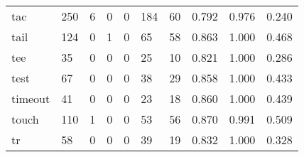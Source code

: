 \begin{longtable}{lp{1.3cm}p{1.3cm}p{1.3cm}p{1.3cm}p{1.3cm}p{1.3cm}p{1.3cm}p{1.3cm}p{1.3cm}}
tac       &                    250 &                                             6 &                                            0 &                                           0 &                                          184 &                                         60 &                                0.792 &                                  0.976 &                                0.240 \\
tail      &                    124 &                                             0 &                                            1 &                                           0 &                                           65 &                                         58 &                                0.863 &                                  1.000 &                                0.468 \\
tee       &                     35 &                                             0 &                                            0 &                                           0 &                                           25 &                                         10 &                                0.821 &                                  1.000 &                                0.286 \\
test      &                     67 &                                             0 &                                            0 &                                           0 &                                           38 &                                         29 &                                0.858 &                                  1.000 &                                0.433 \\
timeout   &                     41 &                                             0 &                                            0 &                                           0 &                                           23 &                                         18 &                                0.860 &                                  1.000 &                                0.439 \\
touch     &                    110 &                                             1 &                                            0 &                                           0 &                                           53 &                                         56 &                                0.870 &                                  0.991 &                                0.509 \\
tr        &                     58 &                                             0 &                                            0 &                                           0 &                                           39 &                                         19 &                                0.832 &                                  1.000 &                                0.328 \\

\end{longtable}
